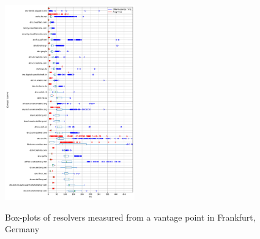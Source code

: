 \begin{figure}[t!]
{        \includegraphics[width=0.5\textwidth]{figures/Frankfurt_Europe.png}
    }
    \caption{Box-plots of resolvers measured from a vantage point in Frankfurt, Germany}
\end{figure}

